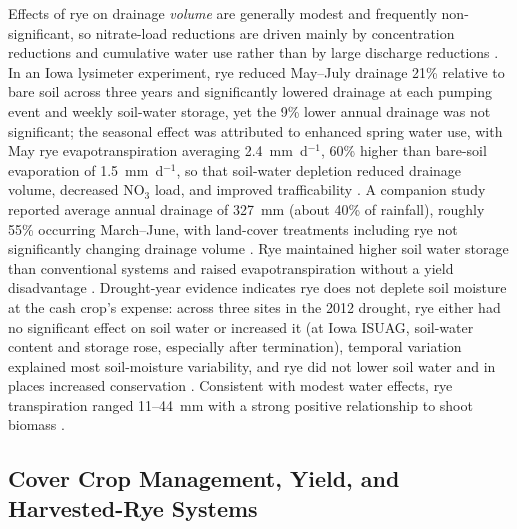 \documentclass[11pt]{article}
\begin{document}
Effects of rye on drainage \emph{volume} are generally modest and frequently non-significant, so nitrate-load reductions are driven mainly by concentration reductions and cumulative water use rather than by large discharge reductions \parencite{Kaspar2012,MartinezFeria2016,Waring2020,Qi2011b}. In an Iowa lysimeter experiment, rye reduced May--July drainage 21\% relative to bare soil across three years and significantly lowered drainage at each pumping event and weekly soil-water storage, yet the 9\% lower annual drainage was not significant; the seasonal effect was attributed to enhanced spring water use, with May rye evapotranspiration averaging 2.4~mm~d$^{-1}$, 60\% higher than bare-soil evaporation of 1.5~mm~d$^{-1}$, so that soil-water depletion reduced drainage volume, decreased NO$_3$ load, and improved trafficability \parencite{Qi2010b}. A companion study reported average annual drainage of 327~mm (about 40\% of rainfall), roughly 55\% occurring March--June, with land-cover treatments including rye not significantly changing drainage volume \parencite{Qi2011b}. Rye maintained higher soil water storage than conventional systems and raised evapotranspiration without a yield disadvantage \parencite{Qi2011}. Drought-year evidence indicates rye does not deplete soil moisture at the cash crop's expense: across three sites in the 2012 drought, rye either had no significant effect on soil water or increased it (at Iowa ISUAG, soil-water content and storage rose, especially after termination), temporal variation explained most soil-moisture variability, and rye did not lower soil water and in places increased conservation \parencite{Daigh2014b}. Consistent with modest water effects, rye transpiration ranged 11--44~mm with a strong positive relationship to shoot biomass \parencite{MartinezFeria2016}.

\subsection{Cover Crop Management, Yield, and Harvested-Rye Systems}
\end{document}
